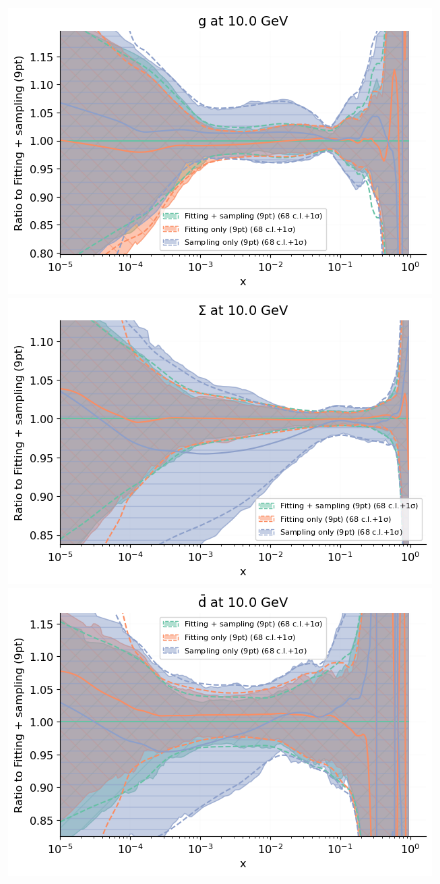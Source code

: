 \begin{figure}[h]
  \begin{center}
    \includegraphics[scale=0.44]{mhous/plots/jplots/j3g.png}
        \includegraphics[scale=0.44]{mhous/plots/jplots/j3sigma.png}
       \includegraphics[scale=0.45]{mhous/plots/jplots/j3d.png}

\end{center}
\end{figure}
